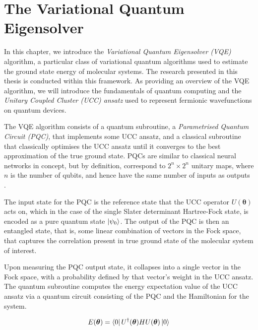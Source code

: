 \section{The Variational Quantum Eigensolver}%
\label{vqe}

In this chapter, we introduce the \textit{Variational Quantum Eigensolver (VQE)} algorithm, a particular class of variational quantum algorithms used to estimate the ground state energy of molecular systems. The research presented in this thesis is conducted within this framework. As providing an overview of the VQE algorithm, we will introduce the fundamentals of quantum computing and the \textit{Unitary Coupled Cluster (UCC) ansatz} used to represent fermionic wavefunctions on quantum devices.

The VQE algorithm consists of a quantum subroutine, a \textit{Parametrised Quantum Circuit (PQC)}, that implements some UCC ansatz, and a classical subroutine that classically optimises the UCC ansatz until it converges to the best approximation of the true ground state. PQCs are similar to classical neural networks in concept, but by definition, correspond to $2^n \times 2^n$ unitary maps, where $n$ is the number of qubits, and hence have the same number of inputs as outputs \cite{Yeung2020}.

The input state for the PQC is the reference state that the UCC operator $U(\bm\theta)$ acts on, which in the case of the single Slater determinant Hartree-Fock state, is encoded as a pure quantum state $\ket{\psi_0}$. The output of the PQC is then an entangled state, that is, some linear combination of vectors in the Fock space, that captures the correlation present in true ground state of the molecular system of interest.

Upon measuring the PQC output state, it collapses into a single vector in the Fock space, with a probability defined by that vector's weight in the UCC ansatz. The quantum subroutine computes the energy expectation value of the UCC ansatz via a quantum circuit consisting of the PQC and the Hamiltonian for the system.

\begin{equation*}
    E(\bm\theta) = \bra{0} U^\dagger(\bm\theta) H U(\bm\theta) \ket{0} 
\end{equation*}

